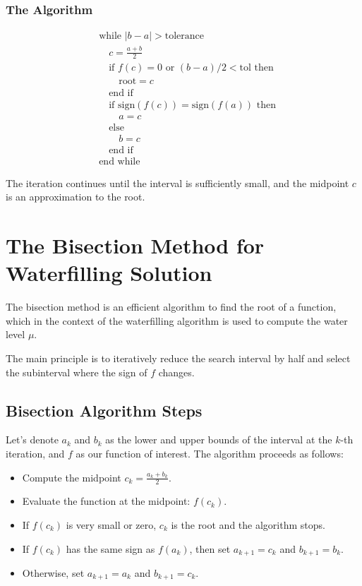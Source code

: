 \subsubsection*{The Algorithm}
\begin{align*}
&\text{while } |b - a| > \text{tolerance} \\
&\quad c = \frac{a + b}{2} \\
&\quad \text{if } f(c) = 0 \text{ or } (b - a)/2 < \text{tol} \text{ then} \\
&\quad \quad \text{root} = c \\
&\quad \text{end if} \\
&\quad \text{if } \text{sign}(f(c)) = \text{sign}(f(a)) \text{ then} \\
&\quad \quad a = c \\
&\quad \text{else} \\
&\quad \quad b = c \\
&\quad \text{end if} \\
&\text{end while}
\end{align*}

The iteration continues until the interval is sufficiently small, and the midpoint \(c\) is an approximation to the root.


\section*{The Bisection Method for Waterfilling Solution}

The bisection method is an efficient algorithm to find the root of a function, which in the context of the waterfilling algorithm is used to compute the water level \(\mu\). 

The main principle is to iteratively reduce the search interval by half and select the subinterval where the sign of \(f\) changes.

\subsection*{Bisection Algorithm Steps}
Let's denote \(a_k\) and \(b_k\) as the lower and upper bounds of the interval at the \(k\)-th iteration, and \(f\) as our function of interest. The algorithm proceeds as follows:

\begin{itemize}
\item Compute the midpoint \(c_k = \frac{a_k + b_k}{2}\).
\item Evaluate the function at the midpoint: \(f(c_k)\).
\item If \(f(c_k)\) is very small or zero, \(c_k\) is the root and the algorithm stops.
\item If \(f(c_k)\) has the same sign as \(f(a_k)\), then set \(a_{k+1} = c_k\) and \(b_{k+1} = b_k\).
\item Otherwise, set \(a_{k+1} = a_k\) and \(b_{k+1} = c_k\).
\end{itemize}

